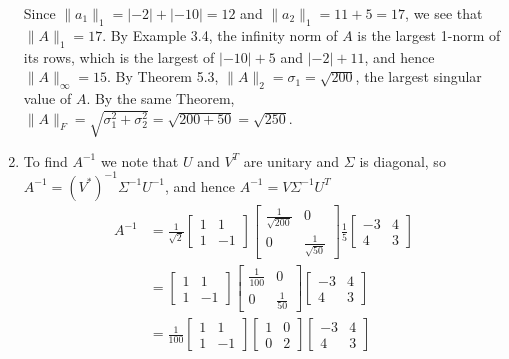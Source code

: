 \documentclass[12pt]{article}
\newenvironment{sol}[1][Solution]{\begin{trivlist}
		\item[\hskip \labelsep {\bfseries #1:}]}{\end{trivlist}}
\begin{document}
\begin{sol}
\begin{enumerate}[label=(\alph*)]
		Since $\lVert a_1\rVert_1 = |-2| + |-10| = 12$ and $\lVert a_2\rVert_1 = 11+5=17$, we see that
		$\lVert A\rVert_1=17$. By Example 3.4, the infinity norm of $A$ is the largest 1-norm of its rows,
		which is the largest of $|-10|+5$ and $|-2|+11$, and hence $\lVert A\rVert_\infty = 15$.
		By Theorem 5.3, $\lVert A\rVert_2=\sigma_1=\sqrt{200}$, the largest singular value of $A$.
		By the same Theorem, $\lVert A\rVert_F=\sqrt{\sigma_1^2+\sigma_2^2}=\sqrt{200+50}=\sqrt{250}$.
		\item To find $A^{-1}$ we note that $U$ and $V^T$ are unitary and $\Sigma$ is diagonal, so
		$A^{-1}=(V^*)^{-1}\Sigma^{-1}U^{-1}$, and hence $A^{-1}=V\Sigma^{-1}U^T$
		\begin{align*}
			A^{-1}&=\frac{1}{\sqrt{2}}\begin{bmatrix}
				1 & 1\\
				1 & -1
			\end{bmatrix}
			\begin{bmatrix}
				\frac{1}{\sqrt{200}} & 0\\
				0 & \frac{1}{\sqrt{50}}
			\end{bmatrix}
			\frac{1}{5}
			\begin{bmatrix}
				-3 & 4\\
				4 & 3
			\end{bmatrix}\\
			&=\begin{bmatrix}
				1 & 1\\
				1 & -1
			\end{bmatrix}
			\begin{bmatrix}
				\frac{1}{100} & 0\\
				0 & \frac{1}{50}
			\end{bmatrix}
			\begin{bmatrix}
				-3 & 4\\
				4 & 3
			\end{bmatrix}\\
			&=\frac{1}{100}
			\begin{bmatrix}
				1 & 1\\
				1 & -1
			\end{bmatrix}
			\begin{bmatrix}
				1 & 0\\
				0 & 2
			\end{bmatrix}
			\begin{bmatrix}
				-3 & 4\\
				4 & 3
			\end{bmatrix}\\

\end{align*}
\end{enumerate}
\end{sol}
\end{document}
